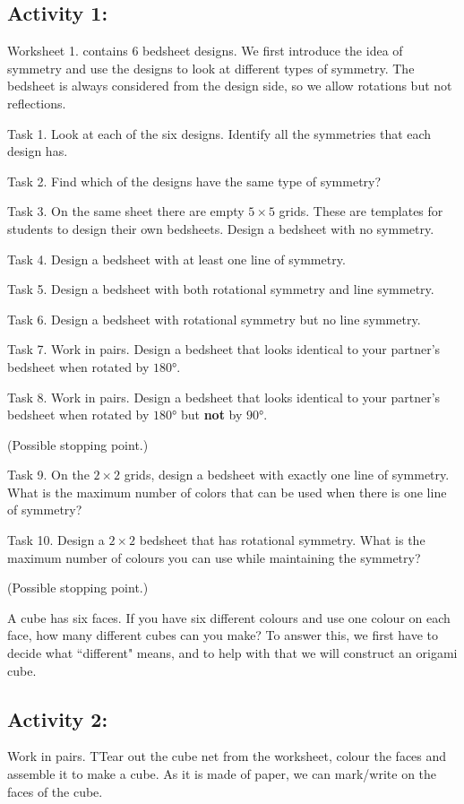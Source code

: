 \documentclass[12pt,a4paper]{program-proposal}
\begin{document}
\subsection{Activity 1:}
Worksheet 1. contains 6 bedsheet designs. We first introduce the idea of symmetry and use the designs to look at different types of symmetry. The bedsheet is always considered from the design side, so we allow rotations but not reflections.

Task 1. Look at each of the six designs. Identify all the symmetries that each design has.

Task 2. Find which of the designs have the same type of symmetry?

Task 3. On the same sheet there are empty $5\times5$ grids. These are templates for students to design their own bedsheets. Design a bedsheet with no symmetry.

Task 4. Design a bedsheet with at least one line of symmetry.

Task 5. Design a bedsheet with both rotational symmetry and line symmetry.

Task 6. Design a bedsheet with rotational symmetry but no line symmetry.

Task 7. Work in pairs. Design a bedsheet that looks identical to your partner's bedsheet when rotated by $\ang{180}$.

Task 8. Work in pairs. Design a bedsheet that looks identical to your partner's bedsheet when rotated by $\ang{180}$ but \textbf{not} by $\ang{90}$.

(Possible stopping point.)

Task 9. On the $2\times2$ grids, design a bedsheet with exactly one line of symmetry. What is the maximum number of colors that can be used when there is one line of symmetry?

Task 10. Design a $2\times2$ bedsheet that has rotational symmetry. What is the maximum number of colours you can use while maintaining the symmetry?

(Possible stopping point.)

A cube has six faces. If you have six different colours and use one colour on each face, how many different cubes can you make? To answer this, we first have to decide what ``different" means, and to help with that we will construct an origami cube.

\subsection{Activity 2:} Work in pairs. TTear out the cube net from the worksheet, colour the faces and assemble it to make a cube. As it is made of paper, we can mark/write on the faces of the cube.
\end{document}
